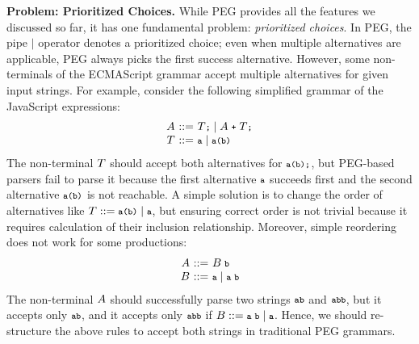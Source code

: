 \smallskip

\textbf{Problem: Prioritized Choices.} While PEG provides all the
features we discussed so far, it has one fundamental problem:
\textit{prioritized choices}.  In PEG, the pipe \( \mid \) operator
denotes a prioritized choice; even when multiple alternatives are
applicable, PEG always picks the first success alternative.  However,
some non-terminals of the ECMAScript grammar accept multiple
alternatives for given input strings.  For example, consider the
following simplified grammar of the JavaScript expressions:
\[
  \begin{array}{r@{~}c@{~}l}
    \NT{A} &::=& \NT{T} \T{;} \mid \NT{A} \; \T{+} \; \NT{T} \T{;} \\
    \NT{T} &::=& \T{a} \mid \T{a} \T{(} \T{b} \T{)}\\
  \end{array}
\]
The non-terminal \( T \) should accept both alternatives for
\( \texttt{\footnotesize a(b);} \), but PEG-based parsers fail to parse it because the
first alternative \( \texttt{\footnotesize a} \) succeeds first and the second alternative
\( \texttt{\footnotesize a} \texttt{\footnotesize(} \texttt{\footnotesize b} \texttt{\footnotesize)} \) is not reachable.  A simple solution is
to change the order of alternatives like \( T ::= \texttt{\footnotesize a} \texttt{\footnotesize(} \texttt{\footnotesize b} \texttt{\footnotesize)} \mid \texttt{\footnotesize a} \),
but ensuring correct order is not trivial because it requires
calculation of their inclusion relationship.  Moreover, simple
reordering does not work for some productions:
\[
  \begin{array}{r@{~}c@{~}l}
    \NT{A} &::=& \NT{B} \; \T{b}\\
    \NT{B} &::=& \T{a} \mid \T{a} \; \T{b}\\
  \end{array}
\]
The non-terminal \( A \) should successfully parse two strings
\( \texttt{\footnotesize ab} \) and \( \texttt{\footnotesize abb} \),  but it accepts only \( \texttt{\footnotesize ab} \),
and it accepts only \( \texttt{\footnotesize abb} \) if \( B ::= \texttt{\footnotesize a} \; \texttt{\footnotesize b} \mid \texttt{\footnotesize a} \).
Hence, we should re-structure the above rules to accept both strings
in traditional PEG grammars.

